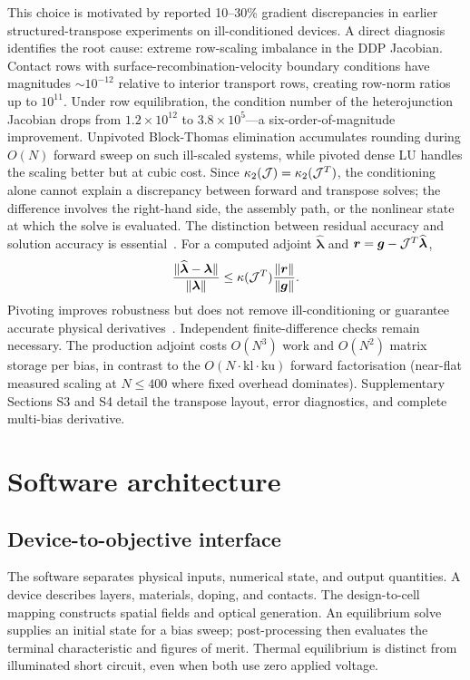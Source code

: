 This choice is motivated by reported 10--30\% gradient discrepancies in
earlier structured-transpose experiments on ill-conditioned devices. A
direct diagnosis identifies the root cause: extreme row-scaling imbalance
in the DDP Jacobian. Contact rows with surface-recombination-velocity
boundary conditions have magnitudes $\sim10^{-12}$ relative to interior
transport rows, creating row-norm ratios up to $10^{11}$. Under row
equilibration, the condition number of the heterojunction Jacobian drops
from $1.2\times10^{12}$ to $3.8\times10^{5}$---a six-order-of-magnitude
improvement. Unpivoted Block-Thomas elimination accumulates rounding
during $O(N)$ forward sweep on such ill-scaled systems, while pivoted
dense LU handles the scaling better but at cubic cost. Since
$\kappa_2(\mathcal{J})=\kappa_2(\mathcal{J}^T)$, the conditioning alone cannot explain a
discrepancy between forward and transpose solves; the difference involves
the right-hand side, the assembly path, or the nonlinear state at which
the solve is evaluated. The distinction between residual accuracy and
solution accuracy is essential~\cite{lapack1999}. For a computed adjoint
$\widehat{\boldsymbol{\lambda}}$ and
$\boldsymbol{r}=\boldsymbol{g}-\mathcal{J}^T\widehat{\boldsymbol{\lambda}}$,
\begin{equation}
\frac{\|\widehat{\boldsymbol{\lambda}}-\boldsymbol{\lambda}\|}
{\|\boldsymbol{\lambda}\|}
\leq\kappa(\mathcal{J}^T)\frac{\|\boldsymbol{r}\|}{\|\boldsymbol{g}\|}.
\label{eq:errorbound}
\end{equation}
Pivoting improves robustness but does not remove ill-conditioning or
guarantee accurate physical derivatives~\cite{lapack1999,demmel1995,ehrhardt2024}. Independent finite-difference
checks remain necessary. The production adjoint costs $O(N^3)$ work and
$O(N^2)$ matrix storage per bias, in contrast to the $O(N\cdot
\mathrm{kl}\cdot\mathrm{ku})$ forward factorisation (near-flat measured
scaling at $N\leq400$ where fixed overhead dominates). Supplementary Sections S3 and S4 detail the transpose layout,
error diagnostics, and complete multi-bias derivative.

\section{Software architecture}\label{sec:software}
\subsection{Device-to-objective interface}
The software separates physical inputs, numerical state, and output
quantities. A device describes layers, materials, doping, and contacts.
The design-to-cell mapping constructs spatial fields and optical
generation. An equilibrium solve supplies an initial state for a bias
sweep; post-processing then evaluates the terminal characteristic and
figures of merit. Thermal equilibrium is distinct from illuminated short
circuit, even when both use zero applied voltage.

